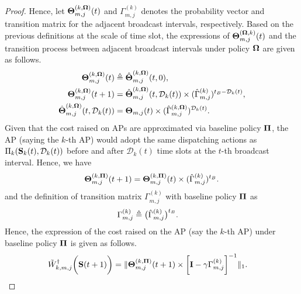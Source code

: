 \begin{proof}
    Hence, let ${\boldsymbol{\Theta}}^{(k, \boldsymbol{\Omega})}_{m,j}(t)$ and ${\Gamma}^{(k)}_{m,j}$ denotes the probability vector and transition matrix for the adjacent broadcast intervals, respectively.
    Based on the previous definitions at the scale of time slot, the expressions of $\boldsymbol{\Theta}^{(\boldsymbol{\Omega}, k)}_{m,j}(t)$ and the transition process between adjacent broadcast intervals under policy $\boldsymbol{\Omega}$ are given as follows.
    \begin{align}
        \boldsymbol{\Theta}^{(k, \boldsymbol{\Omega})}_{m,j}(t) &\triangleq \hat{\boldsymbol{\Theta}}^{(k, \boldsymbol{\Omega})}_{m,j}(t,0),
        \\
        \boldsymbol{\Theta}^{(k, \boldsymbol{\Omega})}_{m,j}(t+1) &= \hat{\boldsymbol{\Theta}}^{(k, \boldsymbol{\Omega})}_{m,j}(t, \mathcal{D}_{k}(t)) \times (\hat{\Gamma}^{(k)}_{m,j})^{t_B-\mathcal{D}_{k}(t)},
        \nonumber\\
        \hat{\boldsymbol{\Theta}}^{(k, \boldsymbol{\Omega})}_{m,j}(t, \mathcal{D}_{k}(t)) &= \boldsymbol{\Theta}_{m,j}(t) \times (\hat{\Gamma}^{(k, \boldsymbol{\Omega})}_{m,j})^{\mathcal{D}_{k}(t)}.
    \end{align}
    Given that the cost raised on APs are approximated via baseline policy $\mathbf{\Pi}$, the AP (saying the $k$-th AP) would adopt the same dispatching actions as $\Pi_{k}(\mathbf{S}_{k}(t), \mathcal{D}_{k}(t))$ before and after $\mathcal{D}_{k}(t)$ time slots at the $t$-th broadcast interval.
    Hence, we have
    \begin{align}
        \boldsymbol{\Theta}^{(k,\mathbf{\Pi})}_{m,j}(t+1) = \boldsymbol{\Theta}^{(k,\mathbf{\Pi})}_{m,j}(t) \times (\hat{\Gamma}^{(k)}_{m,j})^{t_B}.
    \end{align}
    and the definition of transition matrix $\Gamma^{(k)}_{m,j}$ with baseline policy $\mathbf{\Pi}$ as
    \begin{align}
        \Gamma^{(k)}_{m,j} &\triangleq \big( \hat{\Gamma}^{(k)}_{m,j} \big)^{t_B}.
    \end{align}
    Hence, the expression of the cost raised on the AP (say the $k$-th AP) under baseline policy $\mathbf{\Pi}$ is given as follows.
    \begin{align}
        &\tilde{W}^{\dagger}_{k,m,j}\bigg(\mathbf{S}(t+1)\bigg) =
        \lVert
            \boldsymbol{\Theta}^{(k, \mathbf{\Pi})}_{m,j}(t+1) \times
            \bigg[
                \mathbf{I} - \gamma \Gamma^{(k)}_{m,j}
            \bigg]^{-1}
        \|_1.
    \end{align}
\end{proof}

